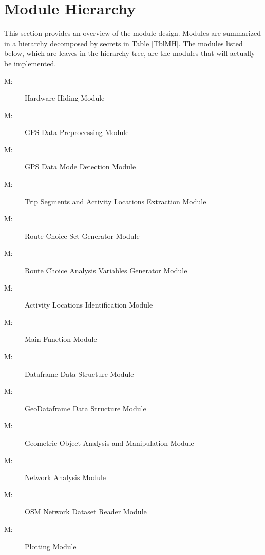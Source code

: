 \documentclass[12pt, titlepage]{article}
\newcounter{mnum}
\newcommand{\mthemnum}{M\themnum}
\begin{document}
\section{Module Hierarchy} \label{SecMH}

This section provides an overview of the module design. Modules are summarized
in a hierarchy decomposed by secrets in Table \ref{TblMH}. The modules listed
below, which are leaves in the hierarchy tree, are the modules that will
actually be implemented.

\begin{description}
\item [ \mthemnum \label{mHH}:] Hardware-Hiding Module
\item [ \mthemnum \label{mGP}:] GPS Data Preprocessing Module 
\item [ \mthemnum \label{mMD}:] GPS Data Mode Detection Module 
\item [ \mthemnum \label{mTSALE}:] Trip Segments and Activity Locations Extraction Module
\item [ \mthemnum \label{mRCS}:] Route Choice Set Generator Module
\item [ \mthemnum \label{mRCAV}:] Route Choice Analysis Variables Generator Module
\item [ \mthemnum \label{mALI}:] Activity Locations Identification Module
\item [ \mthemnum \label{mMF}:] Main Function Module
\item [ \mthemnum \label{mDFDS}:] Dataframe Data Structure Module
\item [ \mthemnum \label{mGDFDS}:] GeoDataframe Data Structure Module
\item [ \mthemnum \label{mGOAM}:] Geometric Object Analysis and Manipulation Module
\item [ \mthemnum \label{mNA}:] Network Analysis Module
\item [ \mthemnum \label{mOSMNDR}:] OSM Network Dataset Reader Module
\item [ \mthemnum \label{mP}:] Plotting Module
\end{description}
\end{document}
